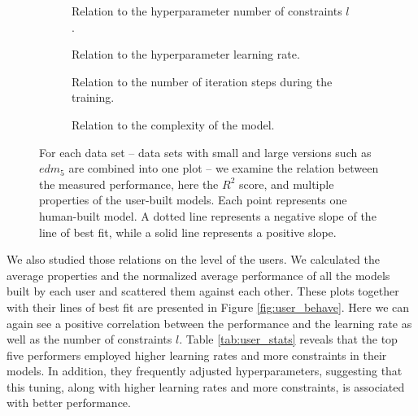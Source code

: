 \begin{figure}[!htbp]
    \centering
    \begin{subfigure}{0.49\textwidth}
        \resizebox{\linewidth}{!}{}
       \caption{Relation to the hyperparameter number of constraints $l$.}
        \label{fig:nr_to_r2}
    \end{subfigure}
    \hfill
  \begin{subfigure}{0.49\textwidth}
        \resizebox{\linewidth}{!}{}
        \caption{Relation to the hyperparameter learning rate.}
        \label{fig:lr_to_r2}
    \end{subfigure}
    \hfill
    \begin{subfigure}{0.49\textwidth}
        \resizebox{\linewidth}{!}{}
        \caption{Relation to the number of iteration steps during the training.}
        \label{fig:ni_to_r2}
    \end{subfigure}
    \hfill
   \begin{subfigure}{0.49\textwidth}
        \resizebox{\linewidth}{!}{}
        \caption{Relation to the complexity of the model.}
        \label{fig:np_to_r2}
    \end{subfigure}

    \caption{For each data set -- data sets with small and large versions such as $edm_5$ are combined into one plot -- we examine the relation between the measured performance, here the $R^2$ score, and multiple properties of the user-built models. Each point represents one human-built model. A dotted line represents a negative slope of the line of best fit, while a solid line represents a positive slope.}
    \label{fig:vals_to_r2}
\end{figure}

We also studied those relations on the level of the users. We calculated the average properties and the normalized average performance of all the models built by each user and scattered them against each other. These plots together with their lines of best fit are presented in Figure \ref{fig:user_behave}. Here we can again see a positive correlation between the performance and the learning rate as well as the number of constraints $l$. Table \ref{tab:user_stats} reveals that the top five performers employed higher learning rates and more constraints in their models. In addition, they frequently adjusted hyperparameters, suggesting that this tuning, along with higher learning rates and more constraints, is associated with better performance.



